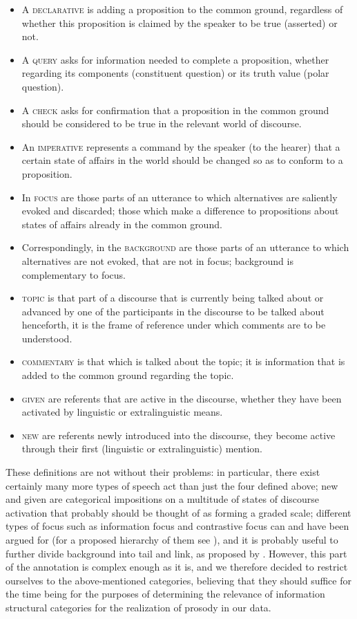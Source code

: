 \documentclass[output=paper]{LSP/langsci}
\begin{document}
\begin{itemize}
\item A \textsc{declarative} is adding a proposition to the common ground, regardless of whether this proposition is claimed by the speaker to be true (asserted) or not.
\item A \textsc{query} asks for information needed to complete a proposition, whether regarding its components (constituent question) or its truth value (polar question).
\item A \textsc{check} asks for confirmation that a proposition in the common ground should be considered to be true in the relevant world of discourse.
\item An \textsc{imperative} represents a command by the speaker (to the hearer) that a certain state of affairs in the world should be changed so as to conform to a proposition.
\item In \textsc{focus} are those parts of an utterance to which alternatives are saliently evoked and discarded; those which make a difference to propositions about states of affairs already in the common ground.
\item Correspondingly, in the \textsc{background} are those parts of an utterance to which alternatives are not evoked, that are not in focus; background is complementary to focus. 
\item \textsc{topic} is that part of a discourse that is currently being talked about or advanced by one of the participants in the discourse to be talked about henceforth, it is the frame of reference under which comments are to be understood. 
\item \textsc{commentary} is that which is talked about the topic; it is information that is added to the common ground regarding the topic. 
\item \textsc{given} are referents that are active in the discourse, whether they have been activated by linguistic or extralinguistic means. 
\item \textsc{new} are referents newly introduced into the discourse, they become active through their first (linguistic or extralinguistic) mention. 
\end{itemize}

These definitions are not without their problems: in particular, there exist certainly many more types of speech act than just the four defined above; new and given are categorical impositions on a multitude of states of discourse activation that probably should be thought of as forming a graded scale; different types of focus such as information focus and contrastive focus can and have been argued for (for a proposed hierarchy of them see \citealt{Fery2013}), and it is probably useful to further divide background into tail and link, as proposed by \citet{Vallduvi1992}. However, this part of the annotation is complex enough as it is, and we therefore decided to restrict ourselves to the above-mentioned categories, believing that they should suffice for the time being for the purposes of determining the relevance of information structural categories for the realization of prosody in our data. 
\end{document}
